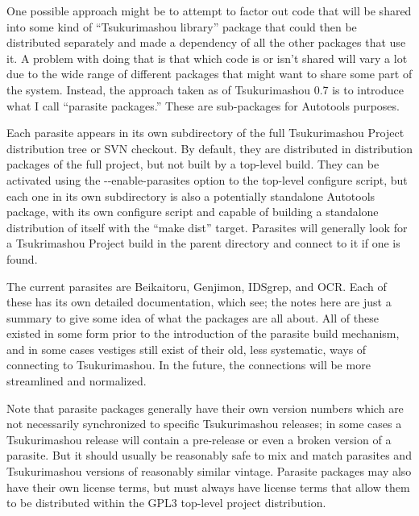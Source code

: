 \documentclass[14pt]{extarticle}
\begin{document}
One possible approach might be to attempt to factor out code that will be
shared into some kind of ``Tsukurimashou library'' package that could then
be distributed separately and made a dependency of all the other packages
that use it.  A problem with doing that is that which code is or isn't
shared will vary a lot due to the wide range of different packages that
might want to share some part of the system.  Instead, the approach taken as
of Tsukurimashou 0.7 is to introduce what I call ``parasite packages.''
These are sub-packages for Autotools purposes.

Each parasite appears in its own subdirectory of the full Tsukurimashou
Project distribution tree or SVN checkout.  By default, they are distributed
in distribution packages of the full project, but not built by a top-level
build.  They can be activated using the -{}-enable-parasites option to the
top-level configure script, but each one in its own subdirectory is also a
potentially standalone Autotools package, with its own configure script and
capable of building a standalone distribution of itself with the ``make
dist'' target.  Parasites will generally look for a Tsukrimashou Project
build in the parent directory and connect to it if one is found.

The current parasites are Beikaitoru, Genjimon, IDSgrep, and OCR.  Each of
these has its own detailed documentation, which see; the notes here are just
a summary to give some idea of what the packages are all about.  All of
these existed in some form prior to the introduction of the parasite build
mechanism, and in some cases vestiges still exist of their old, less
systematic, ways of connecting to Tsukurimashou.  In the future, the
connections will be more streamlined and normalized.

Note that parasite packages generally have their own version numbers which
are not necessarily synchronized to specific Tsukurimashou releases; in some
cases a Tsukurimashou release will contain a pre-release or even a broken
version of a parasite.  But it should usually be reasonably safe to mix and
match parasites and Tsukurimashou versions of reasonably similar vintage. 
Parasite packages may also have their own license terms, but must always
have license terms that allow them to be distributed within the GPL3
top-level project distribution.
\end{document}

